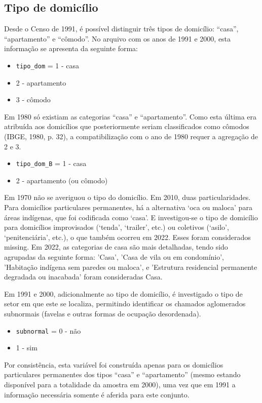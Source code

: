 \documentclass[12pt,a4paper]{article}
\newcommand{\vr}[1]{\texttt{#1}}
\begin{document}
\subsection{Tipo de domicílio}\label{sec:c5}
Desde o Censo de 1991, é possível distinguir três tipos de domicílio: “casa”, “apartamento” e “cômodo”. No arquivo com os anos de 1991 e 2000, esta informação se apresenta da seguinte forma:
\begin{itemize}
  \item \vr{tipo\_dom} = 1 - casa
  \item 2 - apartamento
  \item 3 - cômodo
\end{itemize}

Em 1980 só existiam as categorias “casa” e “apartamento”. Como esta última era atribuída aos domicílios que posteriormente seriam classificados como cômodos (IBGE, 1980, p. 32), a compatibilização com o ano de 1980 requer a agregação de 2 e 3.
\begin{itemize}
  \item \vr{tipo\_dom\_B} = 1 - casa
  \item 2 - apartamento (ou cômodo)
\end{itemize}

Em 1970 não se averiguou o tipo do domicílio. Em 2010, duas particularidades. Para domicílios particulares permanentes, há a alternativa ‘oca ou maloca’ para áreas indígenas, que foi codificada como ‘casa’. E investigou-se o tipo de domicílio para domicílios improvisados (‘tenda’, ‘trailer’, etc.) ou coletivos (‘asilo’, ‘penitenciária’, etc.), o que também ocorreu em 2022. Esses foram considerados missing. Em 2022, as categorias de casa são mais detalhadas, tendo sido agrupadas da seguinte forma: 'Casa', 'Casa de vila ou em condomínio', 'Habitação indígena sem paredes ou maloca', e 'Estrutura residencial permanente degradada ou inacabada' foram consideradas Casa. 

Em 1991 e 2000, adicionalmente ao tipo de domicílio, é investigado o tipo de setor em que este se localiza, permitindo identificar os chamados aglomerados subnormais (favelas e outras formas de ocupação desordenada).
\begin{itemize}
  \item \vr{subnormal} = 0 - não
  \item 1 - sim
\end{itemize}

Por consistência, esta variável foi construída apenas para os domicílios particulares permanentes dos tipos “casa” e “apartamento” (mesmo estando disponível para a totalidade da amostra em 2000), uma vez que em 1991 a informação necessária somente é aferida para este conjunto.
\end{document}

